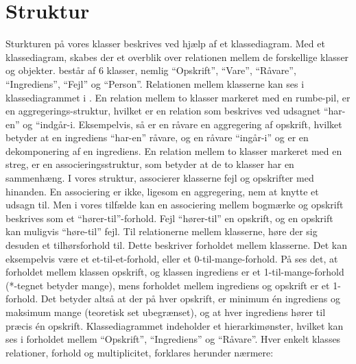 \section{Struktur}
\label{sec:struktur}

Sturkturen på vores klasser beskrives ved hjælp af et klassediagram. Med et klassediagram, skabes der et overblik over relationen mellem de forskellige klasser og objekter. \Foodl{} består af 6 klasser, nemlig ``Opskrift'', ``Vare'', ``Råvare'', ``Ingrediens'', ``Fejl'' og ``Person''. Relationen mellem klasserne kan ses i klassediagrammet i . En relation mellem to klasser markeret med en rumbe-pil, er en aggregerings-struktur, hvilket er en relation som beskrives ved udsagnet ``har-en'' og ``indgår-i. Eksempelvis, så er en råvare en aggregering af opskrift, hvilket betyder at en ingrediens ``har-en'' råvare, og en råvare ``ingår-i'' og er en dekomponering af en ingrediens. En relation mellem to klasser markeret med en streg, er en associeringsstruktur, som betyder at de to klasser har en sammenhæng. I vores struktur, associerer klasserne fejl og opskrifter med hinanden. En associering er ikke, ligesom en aggregering, nem at knytte et udsagn til. Men i vores tilfælde kan en associering mellem bogmærke og opskrift beskrives som et ``hører-til''-forhold. Fejl ``hører-til'' en opskrift, og en opskrift kan muligvis ``høre-til'' fejl. Til relationerne mellem klasserne, høre der sig desuden et tilhørsforhold til. Dette beskriver forholdet mellem klasserne. Det kan eksempelvis være et et-til-et-forhold, eller et 0-til-mange-forhold. På  ses det, at forholdet mellem klassen opskrift, og klassen ingrediens er et 1-til-mange-forhold (*-tegnet betyder mange), mens forholdet mellem ingrediens og opskrift er et 1-forhold. Det betyder altså at der på hver opskrift, er minimum én ingrediens og maksimum mange (teoretisk set ubegrænset), og at hver ingrediens hører til præcis én opskrift. Klassediagrammet indeholder et hierarkimønster, hvilket kan ses i forholdet mellem ``Opskrift'', ``Ingrediens'' og ``Råvare''. Hver enkelt klasses relationer, forhold og multiplicitet, forklares herunder nærmere:





